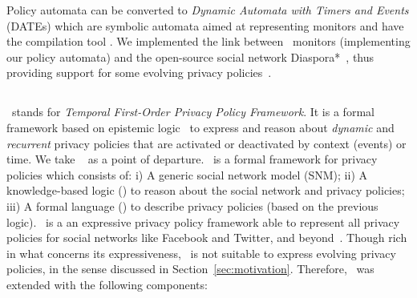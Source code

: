 Policy automata can be converted to \emph{Dynamic Automata with Timers and Events} (DATEs) \cite{CPS08lrt} which are symbolic automata aimed at representing monitors and have the compilation tool \larva. We implemented the link between \larva~monitors (implementing our policy automata) and the open-source social network Diaspora*~\cite{XXX}, thus providing support for some evolving privacy policies~\cite{linktodiasporaourrepo}.

\subsection{\tfppf}

\tfppf~stands for {\em Temporal First-Order Privacy Policy Framework}.
It is a formal framework based on epistemic logic~\cite{FHM+95rk} to express and reason about {\em dynamic} and {\em recurrent} privacy policies that are activated or deactivated by context (events) or time. We take \fppf~\cite{PS14fpp} as a point of departure. \fppf~is a formal framework for privacy policies which consists of:
i) A generic social network model (SNM);
ii) A knowledge-based logic (\kbl) to reason about the social network and privacy policies;
iii) A formal language (\ppl) to describe privacy policies (based on the previous logic).
\fppf~is a an expressive privacy policy framework able to represent all privacy policies for social networks like Facebook and Twitter, and beyond~\cite{PS14fpp}. Though rich in what concerns its expressiveness, \fppf~is not suitable to express evolving privacy policies, in the sense discussed in Section~\ref{sec:motivation}. Therefore, \tfppf~was extended with the following components:
